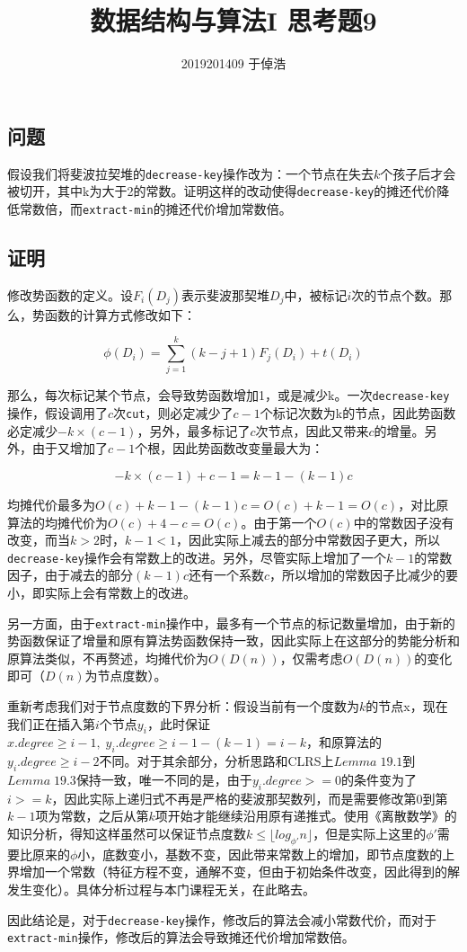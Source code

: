 \documentclass[]{article}
\title{数据结构与算法I 思考题9}
\author{2019201409 于倬浩}
\begin{document}
    
\maketitle
\hypertarget{header-n2}{%
\subsection{问题}\label{header-n2}}

假设我们将斐波拉契堆的\texttt{decrease-key}操作改为：一个节点在失去\(k\)个孩子后才会被切开，其中k为大于2的常数。证明这样的改动使得\texttt{decrease-key}的摊还代价降低常数倍，而\texttt{extract-min}的摊还代价增加常数倍。

\hypertarget{header-n9}{%
\subsection{证明}\label{header-n9}}

修改势函数的定义。设\(F_i(D_j)\)表示斐波那契堆\(D_j\)中，被标记\(i\)次的节点个数。那么，势函数的计算方式修改如下：

\[\phi(D_i) = \sum_{j=1}^{k} (k - j + 1) F_j(D_i) + t(D_i)\]

那么，每次标记某个节点，会导致势函数增加1，或是减少k。一次\texttt{decrease-key}操作，假设调用了\(c\)次\texttt{cut}，则必定减少了\(c-1\)个标记次数为k的节点，因此势函数必定减少\(-k \times(c-1)\)，另外，最多标记了\(c\)次节点，因此又带来\(c\)的增量。另外，由于又增加了\(c - 1\)个根，因此势函数改变量最大为：

\[-k \times (c - 1) + c -1 = k - 1 - (k-1)c\]

均摊代价最多为\(O(c)+k-1-(k-1)c=O(c)+k-1=O(c)\)，对比原算法的均摊代价为\(O(c)+4-c = O(c)\)。由于第一个\(O(c)\)中的常数因子没有改变，而当\(k>2\)时，\(k-1 < 1\)，因此实际上减去的部分中常数因子更大，所以\texttt{decrease-key}操作会有常数上的改进。另外，尽管实际上增加了一个\(k-1\)的常数因子，由于减去的部分\((k-1)c\)还有一个系数\(c\)，所以增加的常数因子比减少的要小，即实际上会有常数上的改进。

另一方面，由于\texttt{extract-min}操作中，最多有一个节点的标记数量增加，由于新的势函数保证了增量和原有算法势函数保持一致，因此实际上在这部分的势能分析和原算法类似，不再赘述，均摊代价为\(O(D(n))\)，仅需考虑\(O(D(n))\)的变化即可（\(D(n)\)为节点度数）。

重新考虑我们对于节点度数的下界分析：假设当前有一个度数为\(k\)的节点x，现在我们正在插入第\(i\)个节点\(y_i\)，此时保证\(x.degree \ge i - 1, \; y_i.degree \ge i - 1 - (k - 1) = i - k\)，和原算法的\(y_i.degree \ge i-2\)不同。对于其余部分，分析思路和CLRS上\(Lemma \;19.1\)到\(Lemma \;19.3\)保持一致，唯一不同的是，由于\(y_i.degree >=0\)的条件变为了\(i >= k\)，因此实际上递归式不再是严格的斐波那契数列，而是需要修改第\(0\)到第\(k-1\)项为常数，之后从第\(k\)项开始才能继续沿用原有递推式。使用《离散数学》的知识分析，得知这样虽然可以保证节点度数\(k \leq \lfloor log_{\phi'} n \rfloor\)，但是实际上这里的\(\phi'\)需要比原来的\(\phi\)小，底数变小，基数不变，因此带来常数上的增加，即节点度数的上界增加一个常数（特征方程不变，通解不变，但由于初始条件改变，因此得到的解发生变化）。具体分析过程与本门课程无关，在此略去。

因此结论是，对于\texttt{decrease-key}操作，修改后的算法会减小常数代价，而对于\texttt{extract-min}操作，修改后的算法会导致摊还代价增加常数倍。
\end{document}
